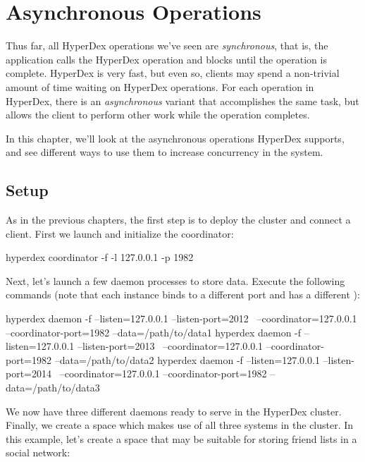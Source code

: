 \chapter{Asynchronous Operations}
\label{chap:async-ops}

Thus far, all HyperDex operations we've seen are {\em synchronous}, that is, the
application calls the HyperDex operation and blocks until the operation is
complete.  HyperDex is very fast, but even so, clients may spend a non-trivial
amount of time waiting on HyperDex operations.  For each operation in HyperDex,
there is an {\em asynchronous} variant that accomplishes the same task, but
allows the client to perform other work while the operation completes.

In this chapter, we'll look at the asynchronous operations HyperDex supports,
and see different ways to use them to increase concurrency in the system.

\section{Setup}
\label{sec:async-ops:setup}

As in the previous chapters, the first step is to deploy the cluster and connect
a client.   First we launch and initialize the coordinator:

\begin{consolecode}
hyperdex coordinator -f -l 127.0.0.1 -p 1982
\end{consolecode}

Next, let's launch a few daemon processes to store data.  Execute the following
commands (note that each instance binds to a different port and has a different
):

\begin{consolecode}
hyperdex daemon -f --listen=127.0.0.1 --listen-port=2012 \
                   --coordinator=127.0.0.1 --coordinator-port=1982 --data=/path/to/data1
hyperdex daemon -f --listen=127.0.0.1 --listen-port=2013 \
                   --coordinator=127.0.0.1 --coordinator-port=1982 --data=/path/to/data2
hyperdex daemon -f --listen=127.0.0.1 --listen-port=2014 \
                   --coordinator=127.0.0.1 --coordinator-port=1982 --data=/path/to/data3
\end{consolecode}

We now have three different daemons ready to serve in the HyperDex cluster.
Finally, we create a space which makes use of all three systems in the cluster.
In this example, let's create a space that may be suitable for storing friend
lists in a social network:

